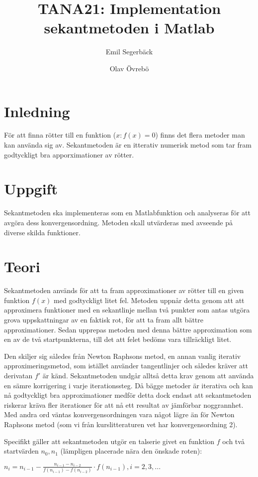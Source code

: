 \documentclass{article}
\title{TANA21: Implementation sekantmetoden i Matlab}
\author{Emil Segerbäck \and Olav Övrebö}
\begin{document}
\maketitle
\newpage

\section{Inledning}
För att finna rötter till en funktion ($x : f(x) = 0$) finns det flera metoder man kan använda sig av. Sekantmetoden är en itterativ numerisk metod som tar fram godtyckligt bra apporximationer av rötter.

\section{Uppgift}
Sekantmetoden ska implementeras som en Matlabfunktion och analyseras för att avgöra dess konvergensordning. Metoden skall utvärderas med avseende på diverse skilda funktioner.

\section{Teori}
Sekantmetoden används för att ta fram approximationer av rötter till en given funktion $f(x)$ med godtyckligt litet fel. Metoden uppnår detta genom att att approximera funktioner med en sekantlinje mellan två punkter som antas utgöra grova uppskattningar av en faktisk rot, för att ta fram allt bättre approximationer. Sedan upprepas metoden med denna bättre approximation som en av de två startpunkterna, till det att felet bedöms vara tillräckligt litet.

Den skiljer sig således från Newton Raphsons metod, en annan vanlig iterativ approximeringsmetod, som istället använder tangentlinjer och således kräver att derivatan $f'$ är känd. Sekantmetoden undgår alltså detta krav genom att använda en sämre korrigering i varje iterationssteg. Då bägge metoder är iterativa och kan nå godtyckligt bra approximationer medför detta dock endast att sekantmetoden riskerar kräva fler iterationer för att nå ett resultat av jämförbar noggrannhet. Med andra ord väntas konvergensordningen vara något lägre än för Newton Raphsons metod (som vi från kurslitteraturen vet har konvergensordning 2).

Specifikt gäller att sekantmetoden utgör en talserie givet en funktion $f$ och två startvärden $n_{0}, n_{1}$ (lämpligen placerade nära den önskade roten): 

$ n_{i} = n_{i-1} - \frac{n_{i-1} - n_{i-2}}{f(n_{i-1}) - f(n_{i-2})} \cdot f(n_{i-1}), i = 2, 3, ...$
\end{document}
